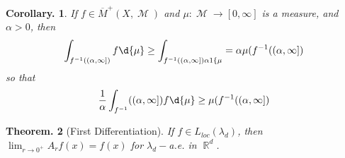 \documentclass[11pt, a4paper]{memoir}
\DeclareMathOperator{\R}{{\mathbb{R}}}
\theoremstyle{change}
\newtheorem{theorem}{Theorem.}[section]
\newtheorem{corollary}[theorem]{Corollary.}
\theoremstyle{plain}
\theoremstyle{nonumberplain}
\DeclareMathOperator{\M}{{\mathcal{M}}}
\begin{document}
\begin{corollary}
    If $f\in\overline{M}^+(X,\M)$ and $\mu:\M\to[0,\infty]$ is a measure, and $\alpha>0$, then
    \begin{equation*}
        \int_{f^{-1}((\alpha,\infty])}f\d{\mu}\geq\int_{f^{-1}((\alpha,\infty])\alpha 1\{\mu}=\alpha\mu(f^{-1}((\alpha,\infty])
    \end{equation*}
    so that
    \begin{equation*}
        \frac{1}{\alpha}\int_{f^{-1}}((\alpha,\infty])f\d{\mu}\geq\mu(f^{-1}((\alpha,\infty])
    \end{equation*}
\end{corollary}
\begin{theorem}[First Differentiation]
    If $f\in L_{loc}(\lambda_d)$, then $\lim_{r\to 0^+}A_rf(x)=f(x)$ for $\lambda_d-$a.e. in $\R^d$.
\end{theorem}
\end{document}
